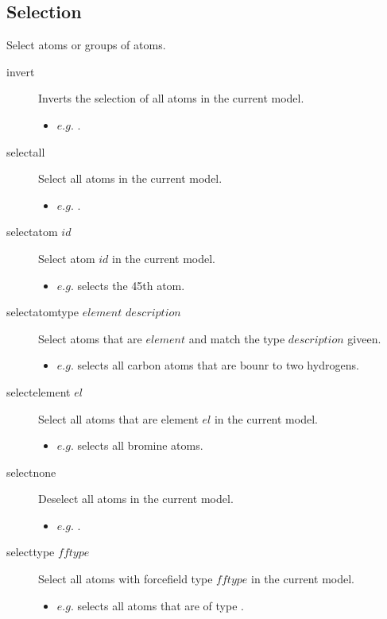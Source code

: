 \subsection{Selection}
Select atoms or groups of atoms.\\
\begin{description}

	\item[invert\its] Inverts the selection of all atoms in the current model.
	\begin{itemize}
		\item $e.g.$ .
	\end{itemize}

	\item[selectall\its] Select all atoms in the current model.
	\begin{itemize}
		\item $e.g.$ .
	\end{itemize}

	\item[selectatom $id$\its] Select atom $id$ in the current model.
	\begin{itemize}
		\item $e.g.$  selects the 45th atom.
	\end{itemize}

	\item[selectatomtype $element$ $description$\its] Select atoms that are $element$ and match the type $description$ giveen.
	\begin{itemize}
		\item $e.g.$  selects all carbon atoms that are bounr to two hydrogens.
	\end{itemize}

	\item[selectelement $el$\its] Select all atoms that are element $el$ in the current model.
	\begin{itemize}
		\item $e.g.$  selects all bromine atoms.
	\end{itemize}

	\item[selectnone\its] Deselect all atoms in the current model.
	\begin{itemize}
		\item $e.g.$ .
	\end{itemize}

	\item[selecttype $fftype$\its] Select all atoms with forcefield type $fftype$ in the current model.
	\begin{itemize}
		\item $e.g.$  selects all atoms that are of type .
	\end{itemize}

\end{description}


